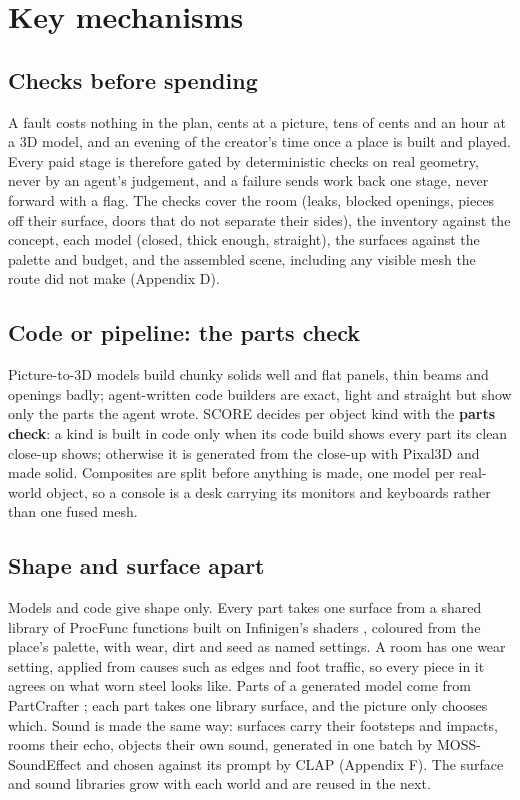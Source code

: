 \section{Key mechanisms}\label{key-mechanisms}

\subsection{Checks before spending}\label{checks-before-spending}

A fault costs nothing in the plan, cents at a picture, tens of cents and an hour at a 3D model, and an evening of the creator's time once a place is built and played. Every paid stage is therefore gated by deterministic checks on real geometry, never by an agent's judgement, and a failure sends work back one stage, never forward with a flag. The checks cover the room (leaks, blocked openings, pieces off their surface, doors that do not separate their sides), the inventory against the concept, each model (closed, thick enough, straight), the surfaces against the palette and budget, and the assembled scene, including any visible mesh the route did not make (Appendix D).

\subsection{Code or pipeline: the parts check}\label{code-or-pipeline-the-parts-check}

Picture-to-3D models build chunky solids well and flat panels, thin beams and openings badly; agent-written code builders are exact, light and straight but show only the parts the agent wrote. SCORE decides per object kind with the \textbf{parts check}: a kind is built in code only when its code build shows every part its clean close-up shows; otherwise it is generated from the close-up with Pixal3D \citep{li2026pixal3d} and made solid. Composites are split before anything is made, one model per real-world object, so a console is a desk carrying its monitors and keyboards rather than one fused mesh.

\subsection{Shape and surface apart}\label{shape-and-surface-apart}

Models and code give shape only. Every part takes one surface from a shared library of ProcFunc functions \citep{raistrick2026procfunc} built on Infinigen's shaders \citep{raistrick2023infinigen}, coloured from the place's palette, with wear, dirt and seed as named settings. A room has one wear setting, applied from causes such as edges and foot traffic, so every piece in it agrees on what worn steel looks like. Parts of a generated model come from PartCrafter \citep{lin2025partcrafter}; each part takes one library surface, and the picture only chooses which. Sound is made the same way: surfaces carry their footsteps and impacts, rooms their echo, objects their own sound, generated in one batch by MOSS-SoundEffect \citep{moss2026} and chosen against its prompt by CLAP \citep{wu2022clap} (Appendix F). The surface and sound libraries grow with each world and are reused in the next.

